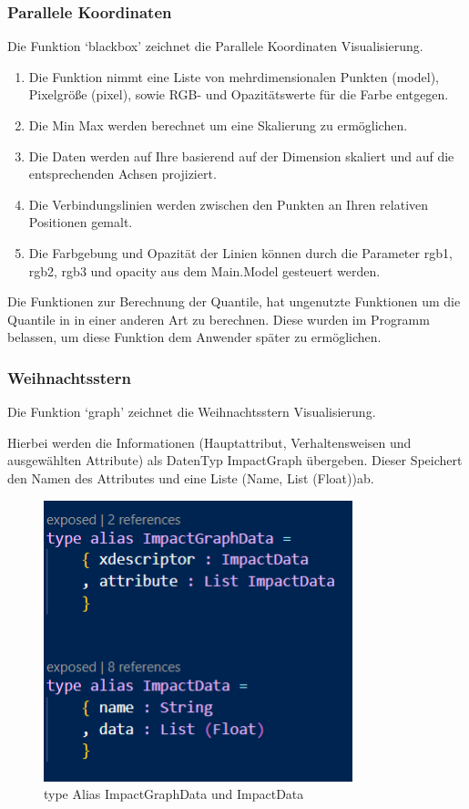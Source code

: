 \documentclass[usegeometry=true]{scrartcl}
\begin{document}
\subsubsection{Parallele Koordinaten}

Die Funktion `blackbox' zeichnet die Parallele Koordinaten Visualisierung.

\begin{enumerate}
\item Die Funktion nimmt eine Liste von mehrdimensionalen Punkten (model), Pixelgröße (pixel), sowie RGB- und Opazitätswerte für die Farbe entgegen.
\item Die Min Max werden berechnet um eine Skalierung zu ermöglichen.
\item Die Daten werden auf Ihre basierend auf der Dimension skaliert und auf die entsprechenden Achsen projiziert.
\item Die Verbindungslinien werden zwischen den Punkten an Ihren relativen Positionen gemalt.
\item Die Farbgebung und Opazität der Linien können durch die Parameter rgb1, rgb2, rgb3 und opacity aus dem Main.Model gesteuert werden.
\end{enumerate}

Die Funktionen zur Berechnung der Quantile, hat ungenutzte Funktionen um die Quantile in in einer anderen Art zu berechnen. Diese wurden im Programm belassen, um diese Funktion dem Anwender später zu ermöglichen.

\subsubsection{Weihnachtsstern}
Die Funktion `graph' zeichnet die Weihnachtsstern Visualisierung.

Hierbei werden die Informationen (Hauptattribut, Verhaltensweisen und ausgewählten Attribute) als DatenTyp ImpactGraph übergeben. Dieser Speichert den Namen des Attributes und eine Liste (Name, List (Float))ab. 


\begin{figure}[h]
  \centering
  \includegraphics [width = 0.8\textwidth]{ImpactGraphData.JPG}
  \caption{ type Alias ImpactGraphData und ImpactData}
\end{figure}
\end{document}
